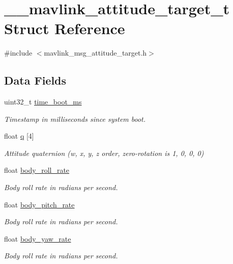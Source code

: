 \hypertarget{struct____mavlink__attitude__target__t}{\section{\+\_\+\+\_\+mavlink\+\_\+attitude\+\_\+target\+\_\+t Struct Reference}
\label{struct____mavlink__attitude__target__t}
}


{\ttfamily \#include $<$mavlink\+\_\+msg\+\_\+attitude\+\_\+target.\+h$>$}

\subsection*{Data Fields}
\begin{DoxyCompactItemize}
\item 
uint32\+\_\+t \hyperlink{struct____mavlink__attitude__target__t_a30f03ea01450aa75dbe6e874862af65f}{time\+\_\+boot\+\_\+ms}
\begin{DoxyCompactList}\small\item\em Timestamp in milliseconds since system boot. \end{DoxyCompactList}\item 
float \hyperlink{struct____mavlink__attitude__target__t_a22e93897167920d75275ffce5e498737}{q} \mbox{[}4\mbox{]}
\begin{DoxyCompactList}\small\item\em Attitude quaternion (w, x, y, z order, zero-\/rotation is 1, 0, 0, 0) \end{DoxyCompactList}\item 
float \hyperlink{struct____mavlink__attitude__target__t_a00211309ef8af7c5b9e62443e57704ae}{body\+\_\+roll\+\_\+rate}
\begin{DoxyCompactList}\small\item\em Body roll rate in radians per second. \end{DoxyCompactList}\item 
float \hyperlink{struct____mavlink__attitude__target__t_a3b3200787da434bba5de48ff5e0aec62}{body\+\_\+pitch\+\_\+rate}
\begin{DoxyCompactList}\small\item\em Body roll rate in radians per second. \end{DoxyCompactList}\item 
float \hyperlink{struct____mavlink__attitude__target__t_a3f999f4c4bd0cb8b9729b174459303c0}{body\+\_\+yaw\+\_\+rate}
\begin{DoxyCompactList}\small\item\em Body roll rate in radians per second. \end{DoxyCompactList}\item 

\end{DoxyCompactItemize}

